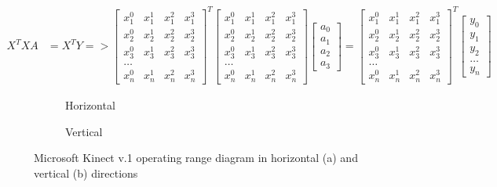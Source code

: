 \documentclass[sensors,article,submit,moreauthors,pdftex,10pt,a4paper]{mdpi}
\begin{document}
\begin{equation}
	\begin{split}
		X^TXA &= X^TY => \begin{bmatrix}
		x_1^0&x_1^1&x_1^2&x_1^3\\
		x_2^0&x_2^1&x_2^2&x_2^3\\
		x_3^0&x_3^1&x_3^2&x_3^3\\
		\dots\\
		x_n^0&x_n^1&x_n^2&x_n^3
		\end{bmatrix}^T
		\begin{bmatrix}
			x_1^0 & x_1^1 & x_1^2 & x_1^3 \\
			x_2^0 & x_2^1 & x_2^2 & x_2^3 \\
			x_3^0 & x_3^1 & x_3^2 & x_3^3 \\
			\dots\\
			x_n^0 & x_n^1 & x_n^2 & x_n^3 
		\end{bmatrix}
		\begin{bmatrix}
			a_0 \\a_1\\a_2\\a_3
		\end{bmatrix}
		=
		\begin{bmatrix}
			x_1^0 & x_1^1 & x_1^2 & x_1^3 \\
			x_2^0 & x_2^1 & x_2^2 & x_2^3 \\
			x_3^0 & x_3^1 & x_3^2 & x_3^3 \\
			\dots\\
			x_n^0 & x_n^1 & x_n^2 & x_n^3 
		\end{bmatrix}^T
		\begin{bmatrix}
			y_0 \\y_1\\y_2\\\dots\\y_n
		\end{bmatrix} 
	\end{split}
	\label{eq:characteristics:kinect:distanceAccuracyPoly}
\end{equation}

\begin{figure}[H] %
	\centering
	\begin{subfigure}[b]{0.4\textwidth}
		\centering
		
		\caption{Horizontal}
		\label{fig:kinect:range:a}
	\end{subfigure} \hfill
	\begin{subfigure}[b]{0.4\textwidth}
		\centering
		
		\caption{Vertical}
		\label{fig:kinect:range:b}
	\end{subfigure} \hfill
	\begin{subfigure}[p]{0.18\textwidth}
		\hfill
		               
	\end{subfigure}
	\caption{Microsoft Kinect v.1 operating range diagram in horizontal (a) and vertical (b) directions}
	\label{fig:kinect:range}
\end{figure}   
\end{document}
